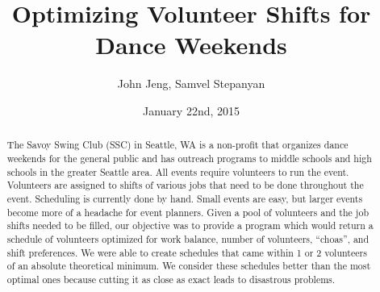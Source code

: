 \documentclass[11pt]{article}
\title{Optimizing Volunteer Shifts for Dance Weekends}
\author{John Jeng, Samvel Stepanyan}
\date{January 22nd, 2015}
\theoremstyle{definition}
\begin{document}
\maketitle
\begin{abstract}
	The Savoy Swing Club (SSC) in Seattle, WA is a non-profit that organizes dance weekends for the general public and has outreach programs to middle schools and high schools in the greater Seattle area. All events require volunteers to run the event. Volunteers are assigned to shifts of various jobs that need to be done throughout the event. Scheduling is currently done by hand. Small events are easy, but larger events become more of a headache for event planners. Given a pool of volunteers and the job shifts needed to be filled, our objective was to provide a program which would return a schedule of volunteers optimized for work balance, number of volunteers, ``choas'', and shift preferences. We were able to create schedules that came within 1 or 2 volunteers of an absolute theoretical minimum. We consider these schedules better than the most optimal ones because cutting it as close as exact leads to disastrous problems.
\end{abstract}
\noindent\makebox[\linewidth]{\rule{\textwidth}{0.4pt}}
\end{document}
